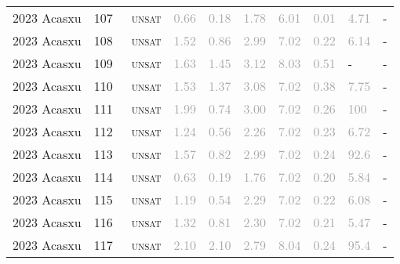 \begin{center}
{\begin{longtable}{@{}llllllllll@{}}
2023 Acasxu & 107 & ~\textsc{unsat} & \textcolor{darkgray}{0.66} & \textcolor{darkgray}{0.18} & \textcolor{darkgray}{1.78} & \textcolor{darkgray}{6.01} & \textcolor{darkgray}{0.01} & \textcolor{darkgray}{4.71} & - \\
2023 Acasxu & 108 & ~\textsc{unsat} & \textcolor{darkgray}{1.52} & \textcolor{darkgray}{0.86} & \textcolor{darkgray}{2.99} & \textcolor{darkgray}{7.02} & \textcolor{darkgray}{0.22} & \textcolor{darkgray}{6.14} & - \\
2023 Acasxu & 109 & ~\textsc{unsat} & \textcolor{darkgray}{1.63} & \textcolor{darkgray}{1.45} & \textcolor{darkgray}{3.12} & \textcolor{darkgray}{8.03} & \textcolor{darkgray}{0.51} & - & - \\
2023 Acasxu & 110 & ~\textsc{unsat} & \textcolor{darkgray}{1.53} & \textcolor{darkgray}{1.37} & \textcolor{darkgray}{3.08} & \textcolor{darkgray}{7.02} & \textcolor{darkgray}{0.38} & \textcolor{darkgray}{7.75} & - \\
2023 Acasxu & 111 & ~\textsc{unsat} & \textcolor{darkgray}{1.99} & \textcolor{darkgray}{0.74} & \textcolor{darkgray}{3.00} & \textcolor{darkgray}{7.02} & \textcolor{darkgray}{0.26} & \textcolor{darkgray}{100} & - \\
2023 Acasxu & 112 & ~\textsc{unsat} & \textcolor{darkgray}{1.24} & \textcolor{darkgray}{0.56} & \textcolor{darkgray}{2.26} & \textcolor{darkgray}{7.02} & \textcolor{darkgray}{0.23} & \textcolor{darkgray}{6.72} & - \\
2023 Acasxu & 113 & ~\textsc{unsat} & \textcolor{darkgray}{1.57} & \textcolor{darkgray}{0.82} & \textcolor{darkgray}{2.99} & \textcolor{darkgray}{7.02} & \textcolor{darkgray}{0.24} & \textcolor{darkgray}{92.6} & - \\
2023 Acasxu & 114 & ~\textsc{unsat} & \textcolor{darkgray}{0.63} & \textcolor{darkgray}{0.19} & \textcolor{darkgray}{1.76} & \textcolor{darkgray}{7.02} & \textcolor{darkgray}{0.20} & \textcolor{darkgray}{5.84} & - \\
2023 Acasxu & 115 & ~\textsc{unsat} & \textcolor{darkgray}{1.19} & \textcolor{darkgray}{0.54} & \textcolor{darkgray}{2.29} & \textcolor{darkgray}{7.02} & \textcolor{darkgray}{0.22} & \textcolor{darkgray}{6.08} & - \\
2023 Acasxu & 116 & ~\textsc{unsat} & \textcolor{darkgray}{1.32} & \textcolor{darkgray}{0.81} & \textcolor{darkgray}{2.30} & \textcolor{darkgray}{7.02} & \textcolor{darkgray}{0.21} & \textcolor{darkgray}{5.47} & - \\
2023 Acasxu & 117 & ~\textsc{unsat} & \textcolor{darkgray}{2.10} & \textcolor{darkgray}{2.10} & \textcolor{darkgray}{2.79} & \textcolor{darkgray}{8.04} & \textcolor{darkgray}{0.24} & \textcolor{darkgray}{95.4} & - \\

\end{longtable}}
\end{center}
